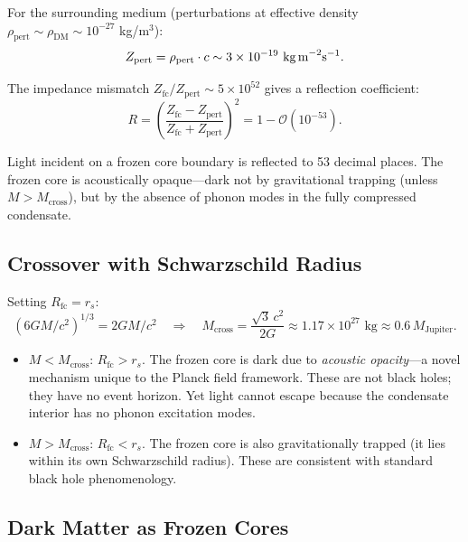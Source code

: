 \documentclass[11pt,a4paper]{article}
\theoremstyle{definition}
\theoremstyle{remark}
\begin{document}
For the surrounding medium (perturbations at effective density $\rho_{\mathrm{pert}} \sim \rho_{\mathrm{DM}} \sim 10^{-27}$ kg/m$^3$):
\begin{equation}
Z_{\mathrm{pert}} = \rho_{\mathrm{pert}} \cdot c \sim 3 \times 10^{-19} \text{ kg\,m}^{-2}\text{s}^{-1}.
\end{equation}

The impedance mismatch $Z_{\mathrm{fc}}/Z_{\mathrm{pert}} \sim 5 \times 10^{52}$ gives a reflection coefficient:
\begin{equation}
R = \left(\frac{Z_{\mathrm{fc}} - Z_{\mathrm{pert}}}{Z_{\mathrm{fc}} + Z_{\mathrm{pert}}}\right)^2 = 1 - \mathcal{O}(10^{-53}).
\end{equation}

Light incident on a frozen core boundary is reflected to 53 decimal places. The frozen core is acoustically opaque---dark not by gravitational trapping (unless $M > M_{\mathrm{cross}}$), but by the absence of phonon modes in the fully compressed condensate.

\subsection{Crossover with Schwarzschild Radius}
\label{sec:crossover}

Setting $R_{\mathrm{fc}} = r_s$:
\begin{equation}
(6GM/c^2)^{1/3} = 2GM/c^2 \quad \Rightarrow \quad M_{\mathrm{cross}} = \frac{\sqrt{3}\,c^2}{2G} \approx 1.17 \times 10^{27} \text{ kg} \approx 0.6\,M_{\mathrm{Jupiter}}.
\end{equation}

\begin{itemize}[leftmargin=*, itemsep=0.2em]
\item $M < M_{\mathrm{cross}}$: $R_{\mathrm{fc}} > r_s$. The frozen core is dark due to \emph{acoustic opacity}---a novel mechanism unique to the Planck field framework. These are not black holes; they have no event horizon. Yet light cannot escape because the condensate interior has no phonon excitation modes.
\item $M > M_{\mathrm{cross}}$: $R_{\mathrm{fc}} < r_s$. The frozen core is also gravitationally trapped (it lies within its own Schwarzschild radius). These are consistent with standard black hole phenomenology.
\end{itemize}

\subsection{Dark Matter as Frozen Cores}
\label{sec:dm_frozen}
\end{document}
